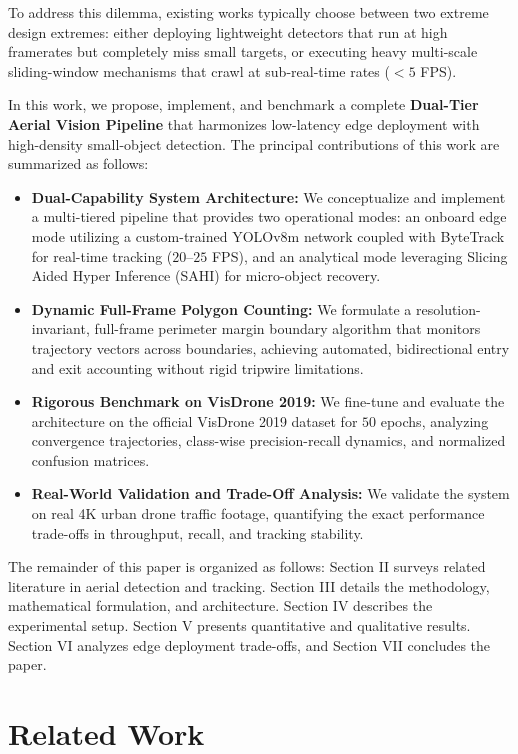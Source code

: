 \documentclass[conference]{IEEEtran}
\begin{document}
To address this dilemma, existing works typically choose between two extreme design extremes: either deploying lightweight detectors that run at high framerates but completely miss small targets, or executing heavy multi-scale sliding-window mechanisms that crawl at sub-real-time rates ($<5$ FPS). 

In this work, we propose, implement, and benchmark a complete \textbf{Dual-Tier Aerial Vision Pipeline} that harmonizes low-latency edge deployment with high-density small-object detection. The principal contributions of this work are summarized as follows:
\begin{itemize}
    \item \textbf{Dual-Capability System Architecture:} We conceptualize and implement a multi-tiered pipeline that provides two operational modes: an onboard edge mode utilizing a custom-trained YOLOv8m network coupled with ByteTrack for real-time tracking ($20$--$25$ FPS), and an analytical mode leveraging Slicing Aided Hyper Inference (SAHI) for micro-object recovery.
    \item \textbf{Dynamic Full-Frame Polygon Counting:} We formulate a resolution-invariant, full-frame perimeter margin boundary algorithm that monitors trajectory vectors across boundaries, achieving automated, bidirectional entry and exit accounting without rigid tripwire limitations.
    \item \textbf{Rigorous Benchmark on VisDrone 2019:} We fine-tune and evaluate the architecture on the official VisDrone 2019 dataset for $50$ epochs, analyzing convergence trajectories, class-wise precision-recall dynamics, and normalized confusion matrices.
    \item \textbf{Real-World Validation and Trade-Off Analysis:} We validate the system on real 4K urban drone traffic footage, quantifying the exact performance trade-offs in throughput, recall, and tracking stability.
\end{itemize}

The remainder of this paper is organized as follows: Section II surveys related literature in aerial detection and tracking. Section III details the methodology, mathematical formulation, and architecture. Section IV describes the experimental setup. Section V presents quantitative and qualitative results. Section VI analyzes edge deployment trade-offs, and Section VII concludes the paper.

\section{Related Work}
\end{document}
